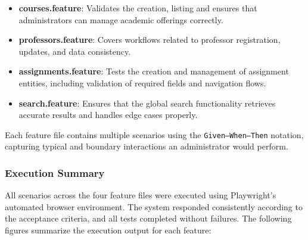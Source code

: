 \documentclass[12pt,a4paper]{article}
\begin{document}
\begin{itemize}
    \item \textbf{courses.feature}: Validates the creation, listing and ensures that administrators can manage academic offerings correctly.
    \item \textbf{professors.feature}: Covers workflows related to professor registration, updates, and data consistency.
    \item \textbf{assignments.feature}: Tests the creation and management of assignment entities, including validation of required fields and navigation flows.
    \item \textbf{search.feature}: Ensures that the global search functionality retrieves accurate results and handles edge cases properly.
\end{itemize}

Each feature file contains multiple scenarios using the \texttt{Given–When–Then} notation, capturing typical and boundary interactions an administrator would perform.

\subsubsection{Execution Summary}
All scenarios across the four feature files were executed using Playwright’s automated browser environment. The system responded consistently according to the acceptance criteria, and all tests completed without failures. The following figures summarize the execution output for each feature:
\end{document}
